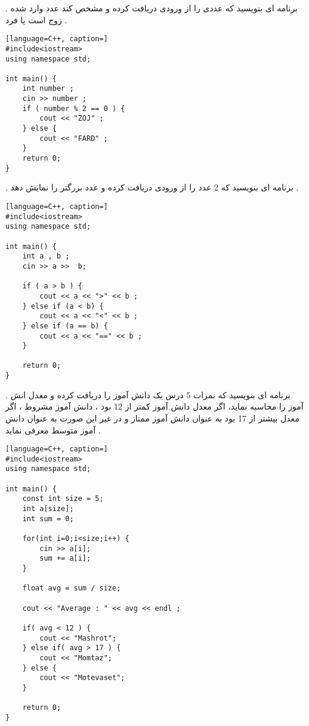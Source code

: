 \documentclass[12pt]{article}
\begin{document}
 . برنامه ای بنویسید که عددی را از ورودی دریافت کرده و مشخص کند عدد وارد شده زوج است یا فرد .






\begin{latin}
\begin{lstlisting}[language=C++, caption=]
#include<iostream>
using namespace std;

int main() {
	int number ; 
	cin >> number ;
	if ( number % 2 == 0 ) {
		cout << "ZOJ" ;
	} else {
		cout << "FARD" ;
	}
	return 0;
}
\end{lstlisting}
\end{latin}









 . برنامه ای بنویسید که 2 عدد را از ورودی دریافت کرده و عدد بزرگتر را نمایش دهد .




\begin{latin}
\begin{lstlisting}[language=C++, caption=]
#include<iostream>
using namespace std;

int main() {
	int a , b ;
	cin >> a >>  b;
    
	if ( a > b ) {
		cout << a << ">" << b ;
	} else if (a < b) {
		cout << a << "<" << b ;
	} else if (a == b) {
		cout << a << "==" << b ;
	}
	
	return 0;
}
\end{lstlisting}
\end{latin}




\newpage

 . برنامه ای بنویسید که نمرات 5 درس یک دانش آموز را دریافت کرده و معدل انش آموز را محاسبه نماید، اگر معدل دانش آموز کمتر از 12 بود ، دانش آموز مشروط ، اگر معدل بیشتر از 17 بود به عنوان دانش آموز ممتاز و در غیر این صورت به عنوان دانش آموز متوسط معرفی نماید .







\begin{latin}
\begin{lstlisting}[language=C++, caption=]
#include<iostream>
using namespace std;

int main() {
	const int size = 5;
	int a[size];
	int sum = 0;
	
	for(int i=0;i<size;i++) {
		cin >> a[i];
		sum += a[i];
	}
	
	float avg = sum / size;
	
	cout << "Average : " << avg << endl ;
	
	if( avg < 12 ) {
		cout << "Mashrot";
	} else if( avg > 17 ) {
		cout << "Momtaz";
	} else {
		cout << "Motevaset";
	}
	
	return 0;
}
\end{lstlisting}
\end{latin}
\end{document}
